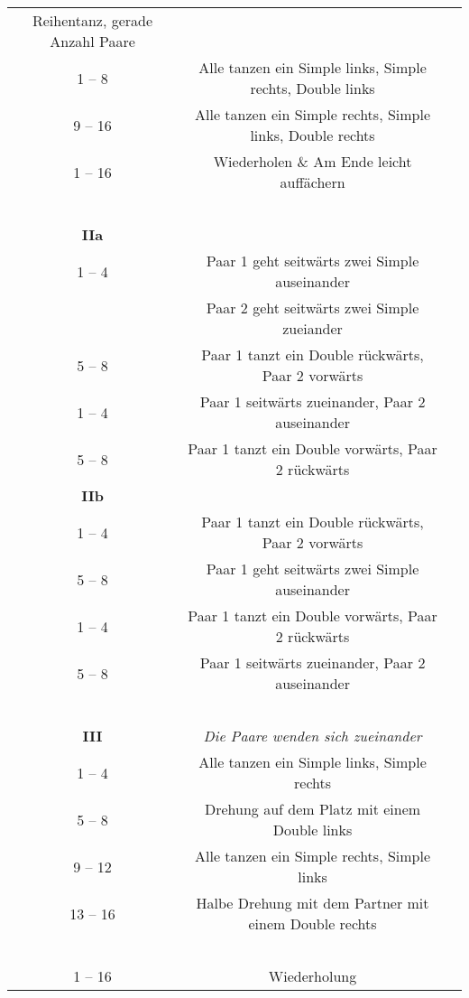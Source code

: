 \documentclass[
	12pt,
	]{scrartcl}
\newif\iffast
\newcommand{\danceinfo}[1]{%
	{\raggedleft\footnotesize{#1}\par}
}
\newcommand{\dancename}[1]{
	\begin{tikzpicture}[remember picture, overlay]
		\node[anchor=north, yshift=-0.5cm, inner sep=0, text width=10.5cm, align=center] at (current page.north){\Huge{#1}};
	\end{tikzpicture}
}
\newcommand{\dancedifficultmarker}{
	\iffast
	\else
		\begin{tikzpicture}[remember picture, overlay]
			\node[anchor=south, xshift=0cm, yshift=0.4cm, inner sep=0] at (current page.south){\pgfornament[width=5cm]{84}};
		\end{tikzpicture}
	\fi
}
\newcommand{\danceinstructionsbegin}{\begin{longtable}{p{1cm}p{9.8cm}}}
\newcommand{\danceinstructionsel}{~ & ~ \\}
\begin{document}
\begin{longtable}{c | c | c}
\newpage

\dancename{Pavane La Battaglia}
\iffalse\subsection{Pavane La Battaglia}\fi %
\danceinfo{Reihentanz, gerade Anzahl Paare}
\danceinstructionsbegin
\textbf{I}&\\
1 -- 8 		& Alle tanzen ein Simple links, Simple rechts, Double links\\
9 -- 16		& Alle tanzen ein Simple rechts, Simple links, Double rechts\\
1 -- 16		& Wiederholen \& Am Ende leicht auffächern\\
\danceinstructionsel
\textbf{IIa}&\\
1 -- 4 		& Paar 1 geht seitwärts zwei Simple auseinander\\
& Paar 2 geht seitwärts zwei Simple zueiander\\
5 -- 8 		& Paar 1 tanzt ein Double rückwärts, Paar 2 vorwärts\\
1 -- 4 		& Paar 1 seitwärts zueinander, Paar 2 auseinander\\
5 -- 8 		& Paar 1 tanzt ein Double vorwärts, Paar 2 rückwärts\\
\textbf{IIb}&\\
1 -- 4 		& Paar 1 tanzt ein Double rückwärts, Paar 2 vorwärts\\
5 -- 8 		& Paar 1 geht seitwärts zwei Simple auseinander\\
1 -- 4 		& Paar 1 tanzt ein Double vorwärts, Paar 2 rückwärts\\
5 -- 8 		& Paar 1 seitwärts zueinander, Paar 2 auseinander\\
\danceinstructionsel
\textbf{III} & \textit{Die Paare wenden sich zueinander}\\
1 -- 4 		& Alle tanzen ein Simple links, Simple rechts\\
5 -- 8 		& Drehung auf dem Platz mit einem Double links\\
9 -- 12 	& Alle tanzen ein Simple rechts, Simple links\\
13 -- 16 	& Halbe Drehung mit dem Partner mit einem Double rechts\\
\danceinstructionsel
1 -- 16 	& Wiederholung\\

\end{longtable}
\end{document}
